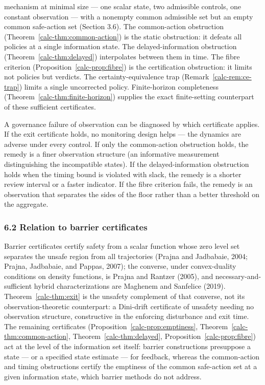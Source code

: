 \documentclass[10pt,twocolumn]{article}
\theoremstyle{definition}
\begin{document}
mechanism at minimal size --- one scalar state, two admissible controls,
one constant observation --- with a nonempty common admissible set but an empty common safe-action set (Section 3.6). The common-action obstruction (Theorem~\ref{calc-thm:common-action}) is the static
obstruction: it defeats all policies at a single information state. The
delayed-information obstruction (Theorem~\ref{calc-thm:delayed}) interpolates between them in
time. The fibre criterion (Proposition~\ref{calc-prop:fibre}) is the certification obstruction:
it limits not policies but verdicts. The certainty-equivalence trap
(Remark~\ref{calc-rem:ce-trap}) limits a single uncorrected policy. Finite-horizon completeness
(Theorem~\ref{calc-thm:finite-horizon}) supplies the exact finite-setting
counterpart of these sufficient certificates.

A governance failure of observation can be diagnosed by which
certificate applies. If the exit certificate holds, no monitoring design
helps --- the dynamics are adverse under every control. If only the
common-action obstruction holds, the remedy is a finer observation
structure (an informative measurement distinguishing the incompatible
states). If the delayed-information obstruction holds when the timing bound
is violated with slack, the remedy is a shorter review interval or a faster
indicator. If the fibre criterion fails, the remedy is an observation
that separates the sides of the floor rather than a better threshold on
the aggregate.

\subsubsection{6.2 Relation to barrier
certificates}\label{calc-relation-to-barrier-certificates}

Barrier certificates certify safety from a scalar function whose zero level set separates the unsafe region from all trajectories (Prajna and Jadbabaie, 2004; Prajna, Jadbabaie, and Pappas, 2007); the converse, under convex-duality conditions on density functions, is Prajna and Rantzer (2005), and necessary-and-sufficient hybrid characterizations are Maghenem and Sanfelice (2019). Theorem~\ref{calc-thm:exit} is the unsafety complement of that converse, not its observation-theoretic counterpart: a Dini-drift certificate of unsafety needing no observation structure, constructive in the enforcing disturbance and exit time. The remaining certificates (Proposition~\ref{calc-prop:emptiness}, Theorem~\ref{calc-thm:common-action}, Theorem~\ref{calc-thm:delayed}, Proposition~\ref{calc-prop:fibre}) act at the level of the information set itself: barrier constructions presuppose a state --- or a specified state estimate --- for feedback, whereas the common-action and timing obstructions certify the emptiness of the common safe-action set at a given information state, which barrier methods do not address.
\end{document}

